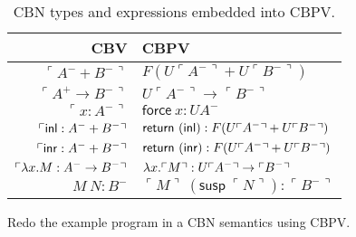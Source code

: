 \documentclass{article}
\newcommand{\exsusp}[1]{\mathsf{susp}~#1}
\newcommand{\exreturn}[1]{\mathsf{return}~#1}
\newcommand{\exforce}[1]{\mathsf{force}~#1}
\newcommand{\transl}[1]{\ulcorner #1 \urcorner}
\begin{document}
\begin{table}[]
    \centering
    \def\arraystretch{1.5}
    \begin{tabular}{r|l}
         CBV & CBPV \\
         \hline 
         $\transl{A^- + B^-}$ & $F(U\transl{A^-} + U\transl{B^-})$ \\
         $\transl{A^+ \to B^-}$ & $U\transl{A^-} \to \transl{B^-}$ \\
         $\transl{x : A^-}$ & $\exforce{x} : UA^-$ \\
         $\transl{\exinl{M} : A^- + B^-}$ & $\exreturn{(\exinl{(\exsusp{\transl{M}})})} : F(U\transl{A^-} + U\transl{B^-})$ \\
         $\transl{\exinr{M} : A^- + B^-}$ & $\exreturn{(\exinr{(\exsusp{\transl{M}})})} : F(U\transl{A^-} + U\transl{B^-})$ \\
         $\transl{\exlam{x}.M : A^- \to B^-}$ & $\exlam{x}.\transl{M} : U\transl{A^-}\to\transl{B^-}$ \\
         $M~N : B^-$ & $\transl{M}~(\exsusp{\transl{N}}) : \transl{B^-}$
    \end{tabular}
    \caption{CBN types and expressions embedded into CBPV.}
    \label{tab:cbn-to-cbpv}
\end{table}

\begin{exercise}
    Redo the example program in a CBN semantics using CBPV.
\end{exercise}



\end{document}

